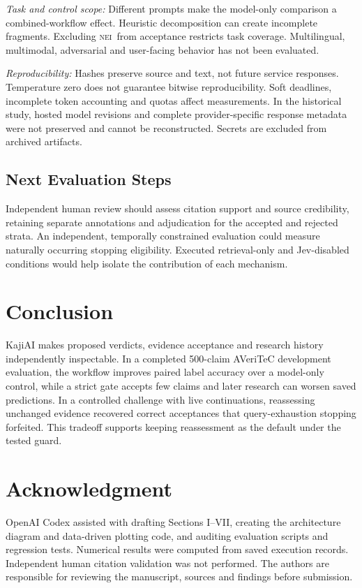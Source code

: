 \documentclass[conference]{IEEEtran}
\newcommand{\NEI}{\textsc{nei}}
\begin{document}
\textit{Task and control scope:} Different prompts make the model-only comparison a combined-workflow effect. Heuristic decomposition can create incomplete fragments. Excluding \NEI\ from acceptance restricts task coverage. Multilingual, multimodal, adversarial and user-facing behavior has not been evaluated.

\textit{Reproducibility:} Hashes preserve source and text, not future service responses. Temperature zero does not guarantee bitwise reproducibility. Soft deadlines, incomplete token accounting and quotas affect measurements. In the historical study, hosted model revisions and complete provider-specific response metadata were not preserved and cannot be reconstructed. Secrets are excluded from archived artifacts.

\subsection{Next Evaluation Steps}
Independent human review should assess citation support and source credibility, retaining separate annotations and adjudication for the accepted and rejected strata. An independent, temporally constrained evaluation could measure naturally occurring stopping eligibility. Executed retrieval-only and Jev-disabled conditions would help isolate the contribution of each mechanism.

\section{Conclusion}
KajiAI makes proposed verdicts, evidence acceptance and research history independently inspectable. In a completed 500-claim AVeriTeC development evaluation, the workflow improves paired label accuracy over a model-only control, while a strict gate accepts few claims and later research can worsen saved predictions. In a controlled challenge with live continuations, reassessing unchanged evidence recovered correct acceptances that query-exhaustion stopping forfeited. This tradeoff supports keeping reassessment as the default under the tested guard.

\section*{Acknowledgment}
OpenAI Codex assisted with drafting Sections I--VII, creating the architecture diagram and data-driven plotting code, and auditing evaluation scripts and regression tests. Numerical results were computed from saved execution records. Independent human citation validation was not performed. The authors are responsible for reviewing the manuscript, sources and findings before submission.
\end{document}
